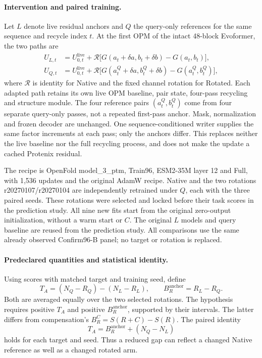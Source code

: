 \paragraph{Intervention and paired training.}
Let $L$ denote live residual anchors and $Q$ the query-only references for
the same sequence and recycle index $t$. At the first OPM of the intact
48-block Evoformer, the two paths are
\begin{align}
 U_{L,t}&=U_{0,t}^{\mathrm{live}}+\mathcal R
 \bigl[G(a_t+\delta a,b_t+\delta b)-G(a_t,b_t)\bigr],\\
 U_{Q,t}&=U_{0,t}^{\mathrm{live}}+\mathcal R
 \bigl[G(a^Q_t+\delta a,b^Q_t+\delta b)-G(a^Q_t,b^Q_t)\bigr],
\end{align}
where $\mathcal R$ is identity for Native and the fixed channel rotation for
Rotated. Each adapted path retains its own live OPM baseline, pair state,
four-pass recycling and structure module. The four reference pairs
$(a^Q_t,b^Q_t)$ come from four separate query-only passes, not a repeated
first-pass anchor. Mask, normalization and frozen decoder are unchanged.
One sequence-conditioned writer supplies the same factor increments at each
pass; only the anchors differ. This replaces neither the live baseline nor
the full recycling process, and does not make the update a cached Protenix
residual.

The recipe is OpenFold model\_3\_ptm, Train96, ESM2-35M layer 12 and Full,
with 1,536 updates and the original AdamW recipe. Native and the two rotations
r20270107/r20270104 are independently retrained under $Q$, each with the
three paired seeds. These rotations were selected and locked before their
task scores in the prediction study. All nine new fits start from the
original zero-output initialization, without a warm start or $C$.
The original $L$ models and query baseline are reused from the prediction
study. All comparisons use the same already observed Confirm96-B panel;
no target or rotation is replaced.

\paragraph{Predeclared quantities and statistical identity.}
Using scores with matched target and training seed, define
\begin{equation}
 T_A=(N_Q-R_Q)-(N_L-R_L),\qquad
 B_R^{\mathrm{anchor}}=R_L-R_Q.
\end{equation}
Both are averaged equally over the two selected rotations. The hypothesis
requires positive $T_A$ and positive $B_R^{\mathrm{anchor}}$, supported by
their intervals. The latter differs from compensation's
$B_R^{C}=S(R+C)-S(R)$.
The paired identity
\begin{equation}
 T_A=B_R^{\mathrm{anchor}}+(N_Q-N_L)
\end{equation}
holds for each target and seed. Thus a reduced gap can reflect a changed
Native reference as well as a changed rotated arm.

